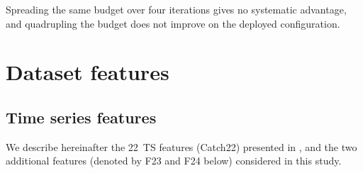 Spreading the same budget over four iterations gives no systematic
advantage, and quadrupling the budget does not improve on the deployed
configuration.


\section{Dataset features}\label{app:feature_risk}

\subsection{Time series features}\label{app:TSF}
We describe hereinafter the 22~TS features (Catch22) presented in \citep{lubba2019catch22}, and the two additional features (denoted by F23 and F24 below) considered in this study.

